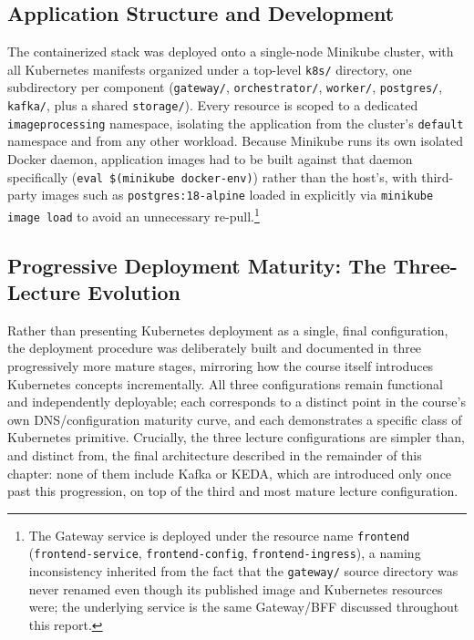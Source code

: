 \documentclass[twoside]{supsistudent}
\begin{document}
\subsection{Application Structure and Development}
The containerized stack was deployed onto a single-node Minikube cluster, with all Kubernetes manifests organized under a top-level \texttt{k8s/} directory, one subdirectory per component (\texttt{gateway/}, \texttt{orchestrator/}, \texttt{worker/}, \texttt{postgres/}, \texttt{kafka/}, plus a shared \texttt{storage/}). Every resource is scoped to a dedicated \texttt{imageprocessing} namespace, isolating the application from the cluster's \texttt{default} namespace and from any other workload. Because Minikube runs its own isolated Docker daemon, application images had to be built against that daemon specifically (\texttt{eval \$(minikube docker-env)}) rather than the host's, with third-party images such as \texttt{postgres:18-alpine} loaded in explicitly via \texttt{minikube image load} to avoid an unnecessary re-pull.\footnote{The Gateway service is deployed under the resource name \texttt{frontend} (\texttt{frontend-service}, \texttt{frontend-config}, \texttt{frontend-ingress}), a naming inconsistency inherited from the fact that the \texttt{gateway/} source directory was never renamed even though its published image and Kubernetes resources were; the underlying service is the same Gateway/BFF discussed throughout this report.}

\subsection{Progressive Deployment Maturity: The Three-Lecture Evolution}
Rather than presenting Kubernetes deployment as a single, final configuration, the deployment procedure was deliberately built and documented in three progressively more mature stages, mirroring how the course itself introduces Kubernetes concepts incrementally. All three configurations remain functional and independently deployable; each corresponds to a distinct point in the course's own DNS/configuration maturity curve, and each demonstrates a specific class of Kubernetes primitive. Crucially, the three lecture configurations are simpler than, and distinct from, the final architecture described in the remainder of this chapter: none of them include Kafka or KEDA, which are introduced only once past this progression, on top of the third and most mature lecture configuration.
\end{document}
